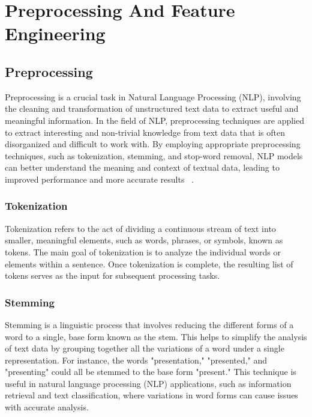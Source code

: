 \documentclass[final]{cvpr}
\begin{document}
\section{Preprocessing And Feature Engineering}
\label{sec:Preprocessing And Feature Engineering}

\subsection{Preprocessing}

Preprocessing is a crucial task in Natural Language Processing (NLP), involving the cleaning and transformation of unstructured text data to extract useful and meaningful information. In the field of NLP, preprocessing techniques are applied to extract interesting and non-trivial knowledge from text data that is often disorganized and difficult to work with. By employing appropriate preprocessing techniques, such as tokenization, stemming, and stop-word removal, NLP models can better understand the meaning and context of textual data, leading to improved performance and more accurate results ~\cite{kannan2014preprocessing}.

\subsubsection{Tokenization}

Tokenization refers to the act of dividing a continuous stream of text into smaller, meaningful elements, such as words, phrases, or symbols, known as tokens. The main goal of tokenization is to analyze the individual words or elements within a sentence. Once tokenization is complete, the resulting list of tokens serves as the input for subsequent processing tasks.

\subsubsection{Stemming}


Stemming is a linguistic process that involves reducing the different forms of a word to a single, base form known as the stem. This helps to simplify the analysis of text data by grouping together all the variations of a word under a single representation. For instance, the words "presentation," "presented," and "presenting" could all be stemmed to the base form "present." This technique is useful in natural language processing (NLP) applications, such as information retrieval and text classification, where variations in word forms can cause issues with accurate analysis.
\end{document}
